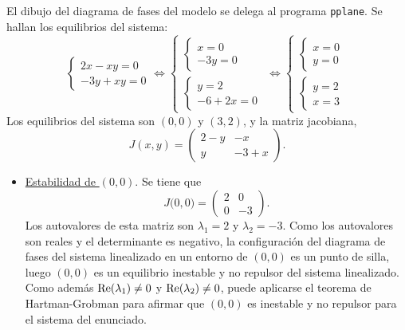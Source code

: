 \documentclass[11pt]{report}
\begin{document}
\begin{solution}
    El dibujo del diagrama de fases del modelo se delega al programa \texttt{pplane}. Se hallan los equilibrios del sistema:
    \[\begin{cases}
        2x-xy = 0 \\
        -3y+xy = 0
    \end{cases} \iff \begin{cases}
        \begin{cases}
            x = 0 \\
            -3y = 0
        \end{cases} \\[20pt]
        \begin{cases}
            y=2 \\
            -6+2x = 0
        \end{cases}
    \end{cases} \iff \begin{cases}
        \begin{cases}
            x = 0 \\
            y = 0
        \end{cases} \\[20pt]
        \begin{cases}
            y = 2 \\
            x = 3
        \end{cases}
    \end{cases} \]
    Los equilibrios del sistema son $(0,0)$ y $(3,2)$, y la matriz jacobiana,
    \[
        J(x,y) = \left(\begin{array}{cc}
            2-y & -x \\
            y & -3+x
        \end{array}\right).
    \]
    \begin{itemize}
        \item \underline{Estabilidad de $(0,0)$}. Se tiene que
        \[J\bigl(0,0\bigr) = \left(\begin{array}{cc}
            2 & 0 \\
            0 & -3
        \end{array}\right).\]
        Los autovalores de esta matriz son $\lambda_1 = 2$ y $\lambda_2 = -3$. Como los autovalores son reales y el determinante es negativo, la configuración del diagrama de fases del sistema linealizado en un entorno de $(0,0)$ es un punto de silla, luego $(0,0)$ es un equilibrio inestable y no repulsor del sistema linealizado. Como además $\textup{Re}(\lambda_1)\neq0$ y $\textup{Re}(\lambda_2)\neq0$, puede aplicarse el teorema de Hartman-Grobman para afirmar que $(0,0)$ es inestable y no repulsor para el sistema del enunciado.

\end{itemize}
\end{solution}
\end{document}
